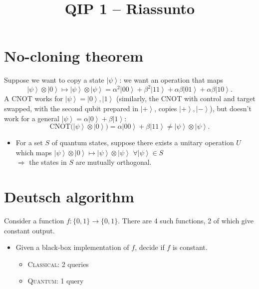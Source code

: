 \documentclass[11pt,a4paper]{article}
\title{QIP 1 -- Riassunto}
\author{}
\date{}
\renewcommand{\ket}[1]{\left|#1\right\rangle}
\begin{document}
\maketitle
\tableofcontents
\newpage

\section{No-cloning theorem}

Suppose we want to copy a state $\ket{\psi}$: we want an operation that maps
\[
\ket{\psi}\otimes\ket{0} \longmapsto \ket{\psi}\otimes\ket{\psi}
= \alpha^2\ket{00} + \beta^2\ket{11} + \alpha\beta\ket{01} + \alpha\beta\ket{10}.
\]
A CNOT works for $\ket{\psi} = \ket{0},\ket{1}$ (similarly, the CNOT with control and target swapped, with the second qubit prepared in $\ket{+}$, copies $\ket{+},\ket{-}$), but doesn't work for a general $\ket{\psi} = \alpha\ket{0}+\beta\ket{1}$:
\[
\mathrm{CNOT}\bigl(\ket{\psi}\otimes\ket{0}\bigr) = \alpha\ket{00} + \beta\ket{11} \neq \ket{\psi}\otimes\ket{\psi}.
\]

\begin{itemize}
  \item For a set $S$ of quantum states, suppose there exists a unitary operation $U$ which maps
  $\ket{\psi}\otimes\ket{0} \mapsto \ket{\psi}\otimes\ket{\psi}$ $\forall \ket{\psi}\in S$\\
  $\Rightarrow$ the states in $S$ are mutually orthogonal.
\end{itemize}

\section{Deutsch algorithm}

Consider a function $f:\{0,1\}\to\{0,1\}$. There are 4 such functions, 2 of which give constant output.
\begin{itemize}
  \item Given a black-box implementation of $f$, decide if $f$ is constant.
  \begin{itemize}
    \item[$\to$] \textsc{Classical}: 2 queries
    \item[$\to$] \textsc{Quantum}: 1 query
  \end{itemize}
\end{itemize}
\end{document}
